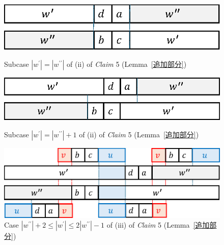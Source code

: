 \begin{figure}[t]
\begin{center}
  \includegraphics[scale=0.45]{figs/w=w_1.eps}
  \caption{Subcase $|w^{\prime}| = |w^{\prime\prime}|$ of (ii) of \textit{Claim} 5 (Lemma~\ref{追加部分})}\label{追加部分7}
  \bigskip
  \includegraphics[scale=0.45]{figs/w=w_1+1.eps}
  \caption{Subcase $|w^{\prime}| = |w^{\prime\prime}| + 1$ of (ii) of \textit{Claim} 5 (Lemma~\ref{追加部分})}\label{追加部分8}
\end{center}
\end{figure}

\begin{figure}[t]
\begin{center}
  \includegraphics[scale=0.45]{figs/w=w_1+2.eps}
  \caption{Case $|w^{\prime\prime}| + 2 \le |w^{\prime}| \le 2|w^{\prime\prime}| - 1$ of (iii) of \textit{Claim} 5 (Lemma~\ref{追加部分})}\label{w1+3}
\end{center}
\end{figure}

